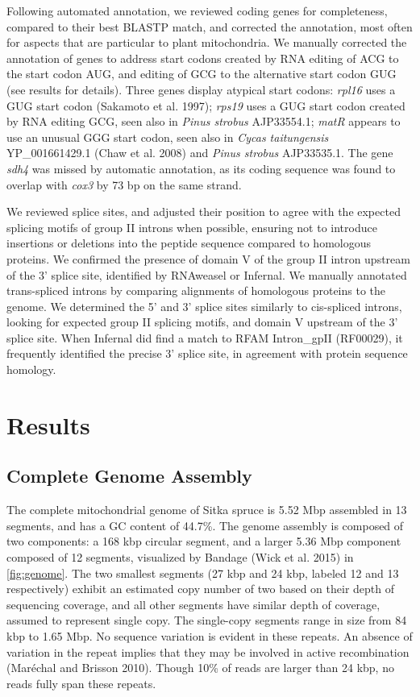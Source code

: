 \documentclass[
  12pt,
  oneside,
  openany]{book}
\begin{document}
Following automated annotation, we reviewed coding genes for completeness, compared to their best BLASTP match, and corrected the annotation, most often for aspects that are particular to plant mitochondria. We manually corrected the annotation of genes to address start codons created by RNA editing of ACG to the start codon AUG, and editing of GCG to the alternative start codon GUG (see results for details). Three genes display atypical start codons: \emph{rpl16} uses a GUG start codon (Sakamoto et al. 1997); \emph{rps19} uses a GUG start codon created by RNA editing GCG, seen also in \emph{Pinus strobus} AJP33554.1; \emph{matR} appears to use an unusual GGG start codon, seen also in \emph{Cycas taitungensis} YP\_001661429.1 (Chaw et al. 2008) and \emph{Pinus strobus} AJP33535.1. The gene \emph{sdh4} was missed by automatic annotation, as its coding sequence was found to overlap with \emph{cox3} by 73 bp on the same strand.

We reviewed splice sites, and adjusted their position to agree with the expected splicing motifs of group II introns when possible, ensuring not to introduce insertions or deletions into the peptide sequence compared to homologous proteins. We confirmed the presence of domain V of the group II intron upstream of the 3' splice site, identified by RNAweasel or Infernal. We manually annotated trans-spliced introns by comparing alignments of homologous proteins to the genome. We determined the 5' and 3' splice sites similarly to cis-spliced introns, looking for expected group II splicing motifs, and domain V upstream of the 3' splice site. When Infernal did find a match to RFAM Intron\_gpII (RF00029), it frequently identified the precise 3' splice site, in agreement with protein sequence homology.

\hypertarget{results-5}{%
\section{Results}\label{results-5}}

\hypertarget{complete-genome-assembly}{%
\subsection{Complete Genome Assembly}\label{complete-genome-assembly}}

The complete mitochondrial genome of Sitka spruce is 5.52 Mbp assembled in 13 segments, and has a GC content of 44.7\%. The genome assembly is composed of two components: a 168 kbp circular segment, and a larger 5.36 Mbp component composed of 12 segments, visualized by Bandage (Wick et al. 2015) in \cref{fig:genome}. The two smallest segments (27 kbp and 24 kbp, labeled 12 and 13 respectively) exhibit an estimated copy number of two based on their depth of sequencing coverage, and all other segments have similar depth of coverage, assumed to represent single copy. The single-copy segments range in size from 84 kbp to 1.65 Mbp. No sequence variation is evident in these repeats. An absence of variation in the repeat implies that they may be involved in active recombination (Maréchal and Brisson 2010). Though 10\% of reads are larger than 24 kbp, no reads fully span these repeats.
\end{document}
